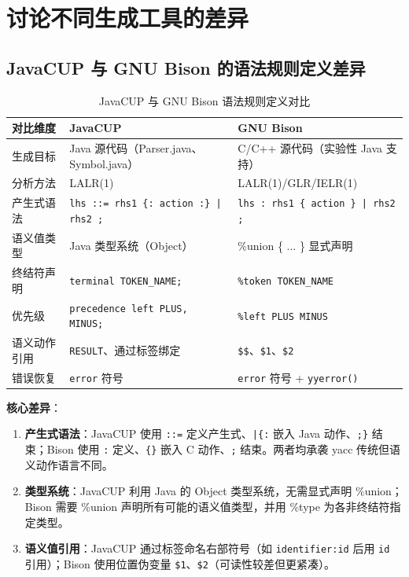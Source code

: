 \section{讨论不同生成工具的差异}

\subsection{JavaCUP 与 GNU Bison 的语法规则定义差异}

\begin{table}[htbp]
    \centering
    \begin{tabular}{|p{2.5cm}|p{5cm}|p{5cm}|}
    \hline
    \textbf{对比维度} & \textbf{JavaCUP} & \textbf{GNU Bison} \\
    \hline
    生成目标 & Java 源代码（Parser.java、Symbol.java） & C/C++ 源代码（实验性 Java 支持）\\
    分析方法 & LALR(1) & LALR(1)/GLR/IELR(1) \\
    产生式语法 & \texttt{lhs ::= rhs1 \{: action :\} | rhs2 ;} & \texttt{lhs : rhs1 \{ action \} | rhs2 ;} \\
    语义值类型 & Java 类型系统（Object） & \%union \{ ... \} 显式声明 \\
    终结符声明 & \texttt{terminal TOKEN\_NAME;} & \texttt{\%token TOKEN\_NAME} \\
    优先级 & \texttt{precedence left PLUS, MINUS;} & \texttt{\%left PLUS MINUS} \\
    语义动作引用 & \texttt{RESULT}、通过标签绑定 & \texttt{\$\$}、\texttt{\$1}、\texttt{\$2} \\
    错误恢复 & \texttt{error} 符号 & \texttt{error} 符号 + \texttt{yyerror()} \\
    \hline
    \end{tabular}
    \caption{JavaCUP 与 GNU Bison 语法规则定义对比}
    \label{tab:yacc-compare}
\end{table}

\textbf{核心差异}：
\begin{enumerate}
    \item \textbf{产生式语法}：JavaCUP 使用 \texttt{::=} 定义产生式、\texttt{|\{:} 嵌入 Java 动作、\texttt{;\}} 结束；Bison 使用 \texttt{:} 定义、\texttt{\{\}} 嵌入 C 动作、\texttt{;} 结束。两者均承袭 yacc 传统但语义动作语言不同。
    \item \textbf{类型系统}：JavaCUP 利用 Java 的 Object 类型系统，无需显式声明 \%union；Bison 需要 \%union 声明所有可能的语义值类型，并用 \%type 为各非终结符指定类型。
    \item \textbf{语义值引用}：JavaCUP 通过标签命名右部符号（如 \texttt{identifier:id} 后用 \texttt{id} 引用）；Bison 使用位置伪变量 \texttt{\$1}、\texttt{\$2}（可读性较差但更紧凑）。
\end{enumerate}

